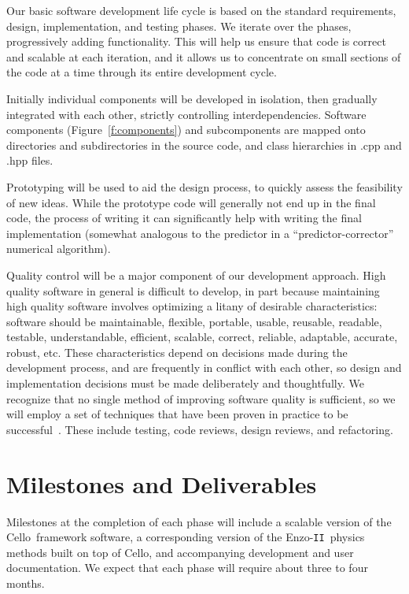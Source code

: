 \documentclass[11pt,letterpaper]{article}
\newcommand{\cello}{\textsf{Cello}}
\newcommand{\enzoii}{\textsf{Enzo}-\texttt{II}}
\begin{document}
Our basic software development life cycle is based on the standard
requirements, design, implementation, and testing phases.  We iterate
over the phases, progressively adding functionality.  This will help
us ensure that code is correct and scalable at each iteration, and it
allows us to concentrate on small sections of the code at a time
through its entire development cycle.  

Initially individual components will be developed in isolation, then
gradually integrated with each other, strictly controlling
interdependencies.  Software components (Figure~\ref{f:components})
and subcomponents are mapped onto directories and subdirectories in
the source code, and class hierarchies in .cpp and .hpp files.

Prototyping will be used to aid the design process, to quickly assess
the feasibility of new ideas.  While the prototype code will generally
not end up in the final code, the process of writing it can
significantly help with writing the final implementation (somewhat
analogous to the predictor in a ``predictor-corrector'' numerical
algorithm).

Quality control will be a major component of our development approach.
High quality software in general is difficult to develop, in part
because maintaining high quality software involves optimizing a litany
of desirable characteristics: software should be maintainable,
flexible, portable, usable, reusable, readable, testable,
understandable, efficient, scalable, correct, reliable, adaptable,
accurate, robust, etc.  These characteristics depend on decisions made
during the development process, and are frequently in conflict with
each other, so design and implementation decisions must be made
deliberately and thoughtfully.  We recognize that no single method of
improving software quality is sufficient, so we will employ a set of
techniques that have been proven in practice to be
successful~\cite{Mc04}.  These include testing, code reviews, design
reviews, and refactoring.



\section{Milestones and Deliverables} \label{s:milestones}

Milestones at the completion of each phase will include a scalable
version of the \cello\ framework software, a corresponding version of
the \enzoii\ physics methods built on top of \cello, and accompanying
development and user documentation.  We expect that each phase will
require about three to four months.
\end{document}

